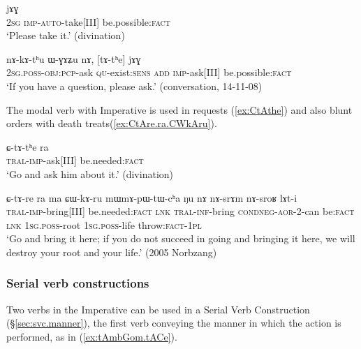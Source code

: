 \begin{exe}
\ex  \label{ex:tAnWndAm.jAG}
 jɤɣ \\
\textsc{2sg} \textsc{imp}-\textsc{auto}-take[III] be.possible:\textsc{fact} \\
\glt `Please take it.' (divination)
\end{exe}

\begin{exe}
\ex  \label{ex:tAthe.jAG}
\gll nɤ-kɤ-tʰu ɯ-ɣɤʑu nɤ, [tɤ-tʰe] jɤɣ \\
\textsc{2sg}.\textsc{poss}-\textsc{obj}:\textsc{pcp}-ask \textsc{qu}-exist:\textsc{sens} \textsc{add} \textsc{imp}-ask[III] be.possible:\textsc{fact} \\
\glt `If you have a question, please ask.' (conversation, 14-11-08)
\end{exe}

The modal verb  with Imperative is used in requests (\ref{ex:CtAthe}) and also blunt orders with death treats(\ref{ex:CtAre.ra.CWkAru}).

\begin{exe}
\ex \label{ex:CtAthe} 
\gll ɕ-tɤ-tʰe ra \\
\textsc{tral}-\textsc{imp}-ask[III] be.needed:\textsc{fact} \\
\glt `Go and ask him about it.' (divination)
\end{exe}

\begin{exe}
\ex \label{ex:CtAre.ra.CWkAru}
\gll  ɕ-tɤ-re ra ma ɕɯ-kɤ-ru mɯ\redp{}mɤ-pɯ-tɯ-cʰa ŋu nɤ nɤ-srɤm nɤ-sroʁ lɤt-i \\
\textsc{tral}-\textsc{imp}-bring[III] be.needed:\textsc{fact} \textsc{lnk} \textsc{tral}-\textsc{inf}-bring \textsc{cond}\redp{}\textsc{neg}-\textsc{aor}-2-can be:\textsc{fact} \textsc{lnk} \textsc{1sg}.\textsc{poss}-root \textsc{1sg}.\textsc{poss}-life throw:\textsc{fact}-\textsc{1pl} \\ 
\glt `Go and bring it here; if you do not succeed in going and bringing it here, we will destroy your root and your life.' (2005 Norbzang)
\end{exe}


\subsubsection{Serial verb constructions} \label{sec:imp.SVC}
Two verbs in the Imperative can be used in a Serial Verb Construction (§\ref{sec:svc.manner}), the first verb conveying the manner in which the action is performed, as in (\ref{ex:tAmbGom.tACe}).

